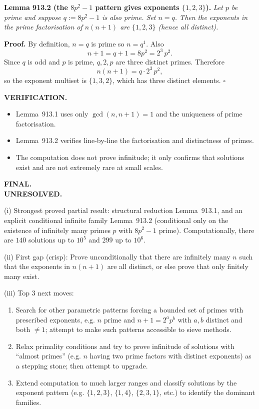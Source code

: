 \medskip
\noindent\textbf{Lemma 913.2 (the $8p^2-1$ pattern gives exponents $\{1,2,3\}$).}  \emph{Let $p$ be prime and suppose $q:=8p^2-1$ is also prime. Set $n=q$. Then the exponents in the prime factorisation of $n(n+1)$ are $\{1,2,3\}$ (hence all distinct).}

\noindent\textbf{Proof.} By definition, $n=q$ is prime so $n=q^1$. Also
\[
 n+1 = q+1 = 8p^2 = 2^3\,p^2.
\]
Since $q$ is odd and $p$ is prime, $q,2,p$ are three distinct primes. Therefore
\[
 n(n+1)= q\cdot 2^3\,p^2,
\]
so the exponent multiset is $\{1,3,2\}$, which has three distinct elements. \hfill$\square$

\medskip
\noindent\textbf{VERIFICATION.}\\
\begin{itemize}
\item Lemma~913.1 uses only $\gcd(n,n+1)=1$ and the uniqueness of prime factorisation.
\item Lemma~913.2 verifies line-by-line the factorisation and distinctness of primes.
\item The computation does not prove infinitude; it only confirms that solutions exist and are not extremely rare at small scales.
\end{itemize}

\medskip
\noindent\textbf{FINAL.}\\
\textbf{UNRESOLVED.}

(i) Strongest proved partial result: structural reduction Lemma~913.1, and an explicit conditional infinite family Lemma~913.2 (conditional only on the existence of infinitely many primes $p$ with $8p^2-1$ prime). Computationally, there are $140$ solutions up to $10^5$ and $299$ up to $10^6$.

(ii) First gap (crisp): Prove unconditionally that there are infinitely many $n$ such that the exponents in $n(n+1)$ are all distinct, or else prove that only finitely many exist.

(iii) Top 3 next moves:
\begin{enumerate}
\item Search for other parametric patterns forcing a bounded set of primes with prescribed exponents, e.g. $n$ prime and $n+1=2^a p^b$ with $a,b$ distinct and both $\ne 1$; attempt to make such patterns accessible to sieve methods.
\item Relax primality conditions and try to prove infinitude of solutions with ``almost primes'' (e.g. $n$ having two prime factors with distinct exponents) as a stepping stone; then attempt to upgrade.
\item Extend computation to much larger ranges and classify solutions by the exponent pattern (e.g. $\{1,2,3\}$, $\{1,4\}$, $\{2,3,1\}$, etc.) to identify the dominant families.
\end{enumerate}

